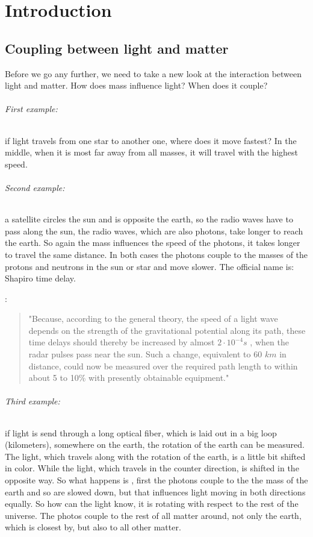 \chapter{Introduction}


\section{Coupling between light and matter}
Before we go any further, we need to take a new look at the interaction between light and matter. How does mass influence light? When does it couple? 

\subparagraph{First example:}
 if light travels from one star to another one, where does it move fastest? In the middle, when it is most far away from all masses, it will travel with the highest speed. 


\subparagraph{Second example:} a satellite circles the sun and is opposite the earth, so the radio waves have to pass along the sun, the radio waves, which are also photons, take longer to reach the earth. So again the mass influences the speed of the photons, it takes longer to travel the same distance. In both cases the photons couple to the masses of the protons and neutrons in the sun or star and move slower. The official name is: Shapiro time delay.

\cite{Shapiro}:
\begin{quotation}

"Because, according to the general theory, the speed of a light wave depends on the strength of the gravitational potential along its path, these time delays should thereby be increased by almost $2\cdot10^{-4}s$ , when the radar pulses pass near the sun. Such a change, equivalent to 60 $km$ in distance, could now be measured over the required path length to within about 5 to 10\% with presently obtainable equipment."

 \end{quotation}


\subparagraph{Third example:}
 if light is send through a long optical fiber, which is laid out in a big loop (kilometers), somewhere on the earth, the rotation of the earth can be measured. The light, which travels along with the rotation of the earth, is a little bit shifted in color. While the light, which travels in the counter direction, is shifted in the opposite way. So what happens is , first the photons couple to the the mass of the earth and so are slowed down, but that influences light moving in both directions equally. So how can the light know, it is rotating with respect to the rest of the universe. The photos couple to the rest of all matter around, not only the earth, which is closest by, but also to all other matter.

